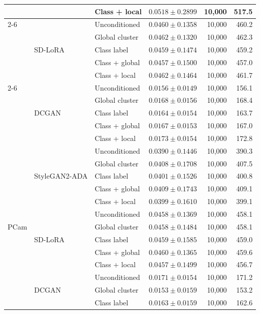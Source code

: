 \begin{table}[htbp]
\begin{tabular}{lllrrr}
 &  & Class + local & $0.0518 \pm 0.2899$ & 10,000 & 517.5 \\
\cmidrule(lr){2-6}
 & \multirow{5}{*}{SD-LoRA} & Unconditioned & $0.0460 \pm 0.1358$ & 10,000 & 460.2 \\
 &  & Global cluster & $0.0462 \pm 0.1320$ & 10,000 & 462.3 \\
 &  & Class label & $0.0459 \pm 0.1474$ & 10,000 & 459.2 \\
 &  & Class + global & $0.0457 \pm 0.1500$ & 10,000 & 457.0 \\
 &  & Class + local & $0.0462 \pm 0.1464$ & 10,000 & 461.7 \\
\cmidrule(lr){2-6}
 & \multirow{5}{*}{DCGAN} & Unconditioned & $0.0156 \pm 0.0149$ & 10,000 & 156.1 \\
 &  & Global cluster & $0.0168 \pm 0.0156$ & 10,000 & 168.4 \\
 &  & Class label & $0.0164 \pm 0.0154$ & 10,000 & 163.7 \\
 &  & Class + global & $0.0167 \pm 0.0153$ & 10,000 & 167.0 \\
 &  & Class + local & $0.0173 \pm 0.0154$ & 10,000 & 172.8 \\
\midrule
\multirow{15}{*}{PCam} & \multirow{5}{*}{StyleGAN2-ADA} & Unconditioned & $0.0390 \pm 0.1446$ & 10,000 & 390.3 \\
 &  & Global cluster & $0.0408 \pm 0.1708$ & 10,000 & 407.5 \\
 &  & Class label & $0.0401 \pm 0.1526$ & 10,000 & 400.8 \\
 &  & Class + global & $0.0409 \pm 0.1743$ & 10,000 & 409.1 \\
 &  & Class + local & $0.0399 \pm 0.1610$ & 10,000 & 399.1 \\
\cmidrule(lr){2-6}
 & \multirow{5}{*}{SD-LoRA} & Unconditioned & $0.0458 \pm 0.1369$ & 10,000 & 458.1 \\
 &  & Global cluster & $0.0458 \pm 0.1484$ & 10,000 & 458.1 \\
 &  & Class label & $0.0459 \pm 0.1585$ & 10,000 & 459.0 \\
 &  & Class + global & $0.0460 \pm 0.1365$ & 10,000 & 459.6 \\
 &  & Class + local & $0.0457 \pm 0.1499$ & 10,000 & 456.7 \\
\cmidrule(lr){2-6}
 & \multirow{5}{*}{DCGAN} & Unconditioned & $0.0171 \pm 0.0154$ & 10,000 & 171.2 \\
 &  & Global cluster & $0.0153 \pm 0.0159$ & 10,000 & 153.2 \\
 &  & Class label & $0.0163 \pm 0.0159$ & 10,000 & 162.6 \\

\end{tabular}
\end{table}
